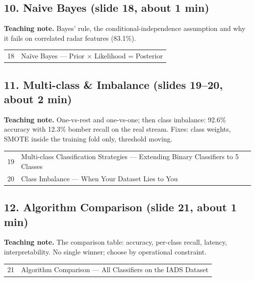 \documentclass[11pt]{article}
\begin{document}
\subsection{10. Naive Bayes \normalfont\small\color{GreyN}(slide 18, about 1 min)}

\textbf{Teaching note.} Bayes' rule, the conditional-independence assumption and why it fails on correlated radar features (83.1\%).

\begin{center}\small\renewcommand{\arraystretch}{1.1}\begin{tabularx}{\textwidth}{@{}r X@{}}18 & Na\"ive Bayes --- Prior $\times$ Likelihood = Posterior\\\end{tabularx}\end{center}

\subsection{11. Multi-class \& Imbalance \normalfont\small\color{GreyN}(slides 19--20, about 2 min)}

\textbf{Teaching note.} One-vs-rest and one-vs-one; then class imbalance: 92.6\% accuracy with 12.3\% bomber recall on the real stream. Fixes: class weights, SMOTE inside the training fold only, threshold moving.

\begin{center}\small\renewcommand{\arraystretch}{1.1}\begin{tabularx}{\textwidth}{@{}r X@{}}19 & Multi-class Classification Strategies --- Extending Binary Classifiers to 5 Classes\\
20 & Class Imbalance --- When Your Dataset Lies to You\\\end{tabularx}\end{center}

\subsection{12. Algorithm Comparison \normalfont\small\color{GreyN}(slide 21, about 1 min)}

\textbf{Teaching note.} The comparison table: accuracy, per-class recall, latency, interpretability. No single winner; choose by operational constraint.

\begin{center}\small\renewcommand{\arraystretch}{1.1}\begin{tabularx}{\textwidth}{@{}r X@{}}21 & Algorithm Comparison --- All Classifiers on the IADS Dataset\\\end{tabularx}\end{center}
\end{document}
